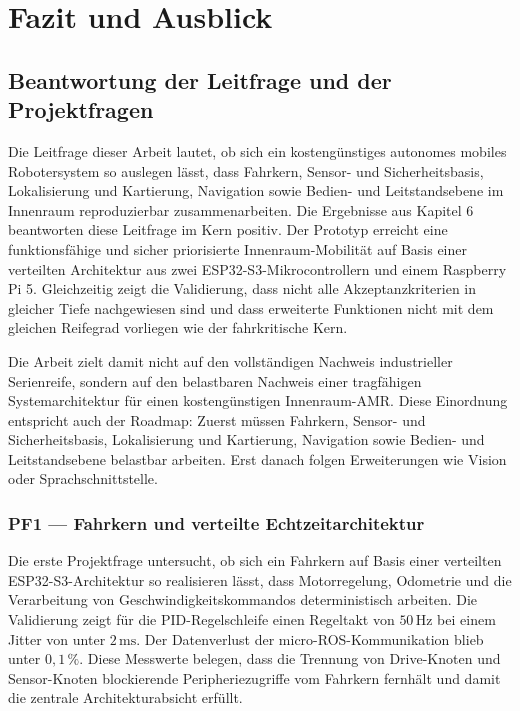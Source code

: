 \chapter{Fazit und Ausblick}

\section{Beantwortung der Leitfrage und der Projektfragen}

Die Leitfrage dieser Arbeit lautet, ob sich ein kostengünstiges autonomes mobiles Robotersystem so auslegen lässt, dass Fahrkern, Sensor- und Sicherheitsbasis, Lokalisierung und Kartierung, Navigation sowie Bedien- und Leitstandsebene im Innenraum reproduzierbar zusammenarbeiten. Die Ergebnisse aus Kapitel 6 beantworten diese Leitfrage im Kern positiv. Der Prototyp erreicht eine funktionsfähige und sicher priorisierte Innenraum-Mobilität auf Basis einer verteilten Architektur aus zwei ESP32-S3-Mikrocontrollern und einem Raspberry Pi 5. Gleichzeitig zeigt die Validierung, dass nicht alle Akzeptanzkriterien in gleicher Tiefe nachgewiesen sind und dass erweiterte Funktionen nicht mit dem gleichen Reifegrad vorliegen wie der fahrkritische Kern.

Die Arbeit zielt damit nicht auf den vollständigen Nachweis industrieller Serienreife, sondern auf den belastbaren Nachweis einer tragfähigen Systemarchitektur für einen kostengünstigen Innenraum-AMR. Diese Einordnung entspricht auch der Roadmap: Zuerst müssen Fahrkern, Sensor- und Sicherheitsbasis, Lokalisierung und Kartierung, Navigation sowie Bedien- und Leitstandsebene belastbar arbeiten. Erst danach folgen Erweiterungen wie Vision oder Sprachschnittstelle.

\subsection{PF1 — Fahrkern und verteilte Echtzeitarchitektur}

Die erste Projektfrage untersucht, ob sich ein Fahrkern auf Basis einer verteilten ESP32-S3-Architektur so realisieren lässt, dass Motorregelung, Odometrie und die Verarbeitung von Geschwindigkeitskommandos deterministisch arbeiten. Die Validierung zeigt für die PID-Regelschleife einen Regeltakt von $50\,\mathrm{Hz}$ bei einem Jitter von unter $2\,\mathrm{ms}$. Der Datenverlust der micro-ROS-Kommunikation blieb unter $0{,}1\,\%$. Diese Messwerte belegen, dass die Trennung von Drive-Knoten und Sensor-Knoten blockierende Peripheriezugriffe vom Fahrkern fernhält und damit die zentrale Architekturabsicht erfüllt.

